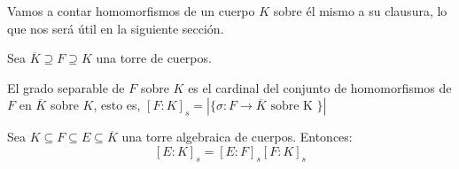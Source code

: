 Vamos a contar homomorfismos de un cuerpo $K$ sobre él mismo a su clausura, lo que nos será útil en la siguiente sección. 

\begin{definition}
Sea $\overline{K} \supseteq F \supseteq K$ una torre de cuerpos. 

El grado separable de $F$ sobre $K$ es el cardinal del conjunto de homomorfismos de $F$ en $\overline{K}$ sobre $K$, esto es, $[F:K]_s = |\{\sigma:F \to \overline{K} \text{ sobre K } \}|$
\end{definition}

\begin{proposition}
Sea $K \subseteq F \subseteq E \subseteq \overline{K}$ una torre algebraica de cuerpos. Entonces: $$[E:K]_s = [E:F]_s[F:K]_s$$
\end{proposition}
